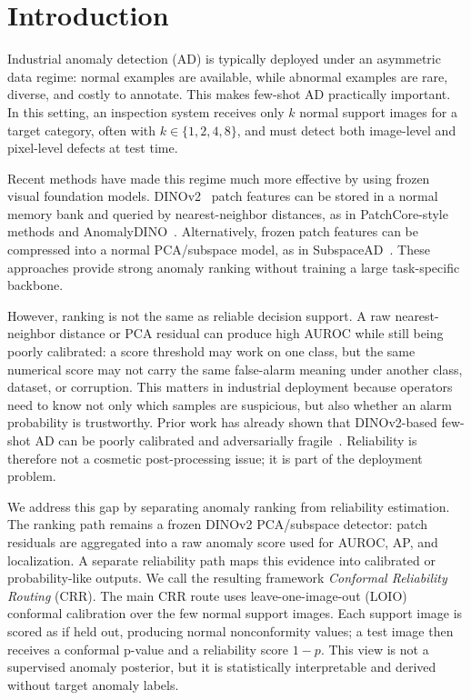 \section{Introduction}
Industrial anomaly detection (AD) is typically deployed under an asymmetric data regime: normal examples are available, while abnormal examples are rare, diverse, and costly to annotate. This makes few-shot AD practically important. In this setting, an inspection system receives only $k$ normal support images for a target category, often with $k\in\{1,2,4,8\}$, and must detect both image-level and pixel-level defects at test time.

Recent methods have made this regime much more effective by using frozen visual foundation models. DINOv2~\cite{dinov22023} patch features can be stored in a normal memory bank and queried by nearest-neighbor distances, as in PatchCore-style methods and AnomalyDINO~\cite{patchcore2021,anomalydino2024}. Alternatively, frozen patch features can be compressed into a normal PCA/subspace model, as in SubspaceAD~\cite{subspacead2026}. These approaches provide strong anomaly ranking without training a large task-specific backbone.

However, ranking is not the same as reliable decision support. A raw nearest-neighbor distance or PCA residual can produce high AUROC while still being poorly calibrated: a score threshold may work on one class, but the same numerical score may not carry the same false-alarm meaning under another class, dataset, or corruption. This matters in industrial deployment because operators need to know not only which samples are suspicious, but also whether an alarm probability is trustworthy. Prior work has already shown that DINOv2-based few-shot AD can be poorly calibrated and adversarially fragile~\cite{khan2025calibration}. Reliability is therefore not a cosmetic post-processing issue; it is part of the deployment problem.

We address this gap by separating anomaly ranking from reliability estimation. The ranking path remains a frozen DINOv2 PCA/subspace detector: patch residuals are aggregated into a raw anomaly score used for AUROC, AP, and localization. A separate reliability path maps this evidence into calibrated or probability-like outputs. We call the resulting framework \emph{Conformal Reliability Routing} (CRR). The main CRR route uses leave-one-image-out (LOIO) conformal calibration over the few normal support images. Each support image is scored as if held out, producing normal nonconformity values; a test image then receives a conformal p-value and a reliability score $1-p$. This view is not a supervised anomaly posterior, but it is statistically interpretable and derived without target anomaly labels.

